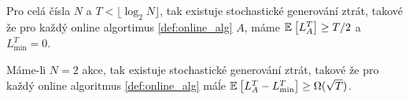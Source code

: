 \begin{theorem}
\label{thm:prop1} 
Pro celá čísla $N$ a $T < \lfloor \log_2 N\rfloor$, tak existuje stochastické generování ztrát, takové že pro každý online algortimus \ref{def:online_alg} $A$, máme $\mathbb{E}_{}\left[L_A^T\right] \geq T/2$ a $L_{\min}^T = 0$.
\end{theorem}
\begin{theorem}
\label{thm:prop2}
Máme-li $N=2$ akce, tak existuje stochastické generování ztrát, takové že pro každý online algoritmus \ref{def:online_alg} máĺe $\mathbb{E}_{}\left[L_A^T - L^T_{\min}\right] \geq \Omega (\sqrt{T})$.
\end{theorem}

